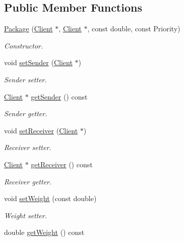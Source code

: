 \subsection*{Public Member Functions}
\begin{DoxyCompactItemize}
\item 
\hyperlink{classPackage_a64d987fe7cb1d583f2af4a38e544a6f2}{Package} (\hyperlink{classClient}{Client} $\ast$, \hyperlink{classClient}{Client} $\ast$, const double, const Priority)
\begin{DoxyCompactList}\small\item\em Constructor. \end{DoxyCompactList}\item 
void \hyperlink{classPackage_a933801e98e91c1d540f9a47926bfc314}{set\+Sender} (\hyperlink{classClient}{Client} $\ast$)
\begin{DoxyCompactList}\small\item\em Sender setter. \end{DoxyCompactList}\item 
\hyperlink{classClient}{Client} $\ast$ \hyperlink{classPackage_a1e603126edbbd5c82c676eb0e6805554}{get\+Sender} () const 
\begin{DoxyCompactList}\small\item\em Sender getter. \end{DoxyCompactList}\item 
void \hyperlink{classPackage_a6a16574423734d7fd0aa4d5a74b0ad32}{set\+Receiver} (\hyperlink{classClient}{Client} $\ast$)
\begin{DoxyCompactList}\small\item\em Receiver setter. \end{DoxyCompactList}\item 
\hyperlink{classClient}{Client} $\ast$ \hyperlink{classPackage_a02e9aee9f9e10b6b6ba124df61bd289d}{get\+Receiver} () const 
\begin{DoxyCompactList}\small\item\em Receiver getter. \end{DoxyCompactList}\item 
void \hyperlink{classPackage_a0766f8a791e0b76d97671cb92d785496}{set\+Weight} (const double)
\begin{DoxyCompactList}\small\item\em Weight setter. \end{DoxyCompactList}\item 
double \hyperlink{classPackage_a2da083a8cab4c978c22c49ac46226aee}{get\+Weight} () const 

\end{DoxyCompactItemize}
